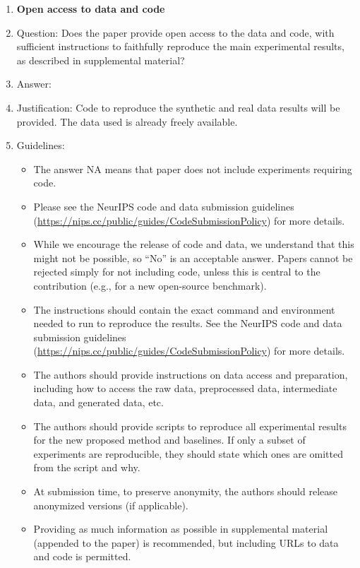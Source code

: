 \documentclass{article}
\theoremstyle{plain}
\theoremstyle{definition}
\theoremstyle{remark}
\begin{document}
\begin{enumerate}
\item {\bf Open access to data and code}
    \item[] Question: Does the paper provide open access to the data and code, with sufficient instructions to faithfully reproduce the main experimental results, as described in supplemental material?
    \item[] Answer: \answerYes{} %
    \item[] Justification: Code to reproduce the synthetic and real data results will be provided. The data used is already freely available.
    \item[] Guidelines:
    \begin{itemize}
        \item The answer NA means that paper does not include experiments requiring code.
        \item Please see the NeurIPS code and data submission guidelines (\url{https://nips.cc/public/guides/CodeSubmissionPolicy}) for more details.
        \item While we encourage the release of code and data, we understand that this might not be possible, so “No” is an acceptable answer. Papers cannot be rejected simply for not including code, unless this is central to the contribution (e.g., for a new open-source benchmark).
        \item The instructions should contain the exact command and environment needed to run to reproduce the results. See the NeurIPS code and data submission guidelines (\url{https://nips.cc/public/guides/CodeSubmissionPolicy}) for more details.
        \item The authors should provide instructions on data access and preparation, including how to access the raw data, preprocessed data, intermediate data, and generated data, etc.
        \item The authors should provide scripts to reproduce all experimental results for the new proposed method and baselines. If only a subset of experiments are reproducible, they should state which ones are omitted from the script and why.
        \item At submission time, to preserve anonymity, the authors should release anonymized versions (if applicable).
        \item Providing as much information as possible in supplemental material (appended to the paper) is recommended, but including URLs to data and code is permitted.
    \end{itemize}



\end{enumerate}
\end{document}
